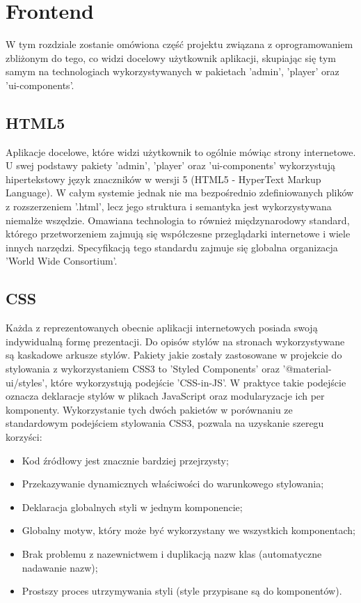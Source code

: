 \chapter{Frontend}
\label{ch:frontend}
W tym rozdziale zostanie omówiona część projektu związana z oprogramowaniem zbliżonym do tego, co widzi docelowy użytkownik aplikacji, skupiając się tym samym na technologiach wykorzystywanych w pakietach 'admin', 'player' oraz 'ui-components'.

\section{HTML5}
Aplikacje docelowe, które widzi użytkownik to ogólnie mówiąc strony internetowe. U swej podstawy pakiety 'admin', 'player' oraz 'ui-components' wykorzystują hipertekstowy język znaczników w wersji 5 (HTML5 - HyperText Markup Language). W całym systemie jednak nie ma bezpośrednio zdefiniowanych plików z rozszerzeniem '.html', lecz jego struktura i semantyka jest wykorzystywana niemalże wszędzie. Omawiana technologia to również międzynarodowy standard, którego przetworzeniem zajmują się współczesne przeglądarki internetowe i wiele innych narzędzi. Specyfikacją tego standardu zajmuje się globalna organizacja 'World Wide Consortium'.\cite{HTMLDocs}

\section{CSS}
Każda z reprezentowanych obecnie aplikacji internetowych posiada swoją indywidualną formę prezentacji. Do opisów stylów na stronach wykorzystywane są kaskadowe arkusze stylów. Pakiety jakie zostały zastosowane w projekcie do stylowania z wykorzystaniem CSS3 to 'Styled Components' oraz '@material-ui/styles', które wykorzystują podejście 'CSS-in-JS'. W praktyce takie podejście oznacza deklaracje stylów w plikach JavaScript oraz modularyzacje ich per komponenty. Wykorzystanie tych dwóch pakietów w porównaniu ze standardowym podejściem stylowania CSS3, pozwala na uzyskanie szeregu korzyści:

\begin{itemize}
    \item Kod źródłowy jest znacznie bardziej przejrzysty;
    \item Przekazywanie dynamicznych właściwości do warunkowego stylowania;
    \item Deklaracja globalnych styli w jednym komponencie;
    \item Globalny motyw, który może być wykorzystany we wszystkich komponentach;
    \item Brak problemu z nazewnictwem i duplikacją nazw klas (automatyczne nadawanie nazw);
    \item Prostszy proces utrzymywania styli (style przypisane są do komponentów).
\end{itemize}

